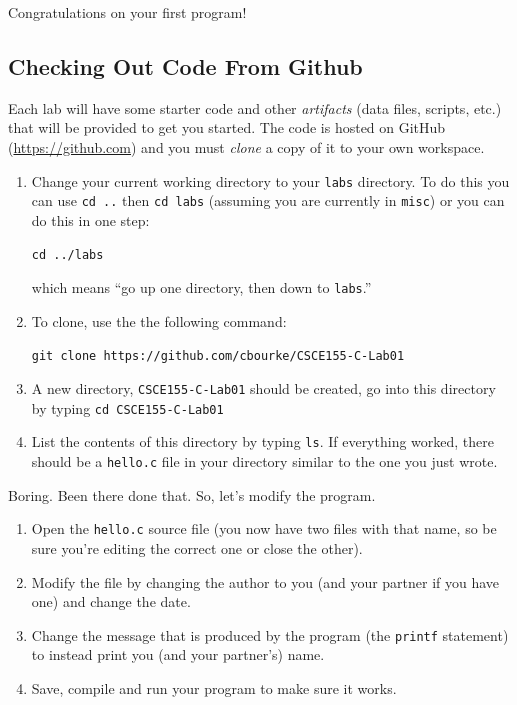 \documentclass[12pt]{scrartcl}
\begin{document}
Congratulations on your first program!

\subsection{Checking Out Code From Github}

Each lab will have some starter code and other \emph{artifacts} (data files, 
scripts, etc.) that will be provided to get you started.  The code is hosted
on GitHub (\url{https://github.com}) and you must \emph{clone} a copy of
it to your own workspace.

\begin{enumerate}
  \item Change your current working directory to your \texttt{labs}
  directory.  To do this you can use \texttt{cd ..} then 
  \texttt{cd labs} (assuming you are currently in \texttt{misc})
  or you can do this in one step: 
  
  \texttt{cd ../labs}
  
  which means ``go up one directory, then down to \texttt{labs}.''
  \item To clone, use the the following command:
  
  \texttt{git clone https://github.com/cbourke/CSCE155-C-Lab01}

  \item A new directory, \texttt{CSCE155-C-Lab01} should be created, 
  go into this directory by typing \texttt{cd CSCE155-C-Lab01}
  
  \item List the contents of this directory by typing \texttt{ls}.  
  If everything worked, there should be a \texttt{hello.c} 
  file in your directory similar to the one you just wrote.
\end{enumerate}

Boring.  Been there done that.  So, let's modify the program. 

\begin{enumerate}
  \item Open the \texttt{hello.c} source file (you now
  have two files with that name, so be sure you're editing the
  correct one or close the other).
  \item Modify the file by changing the author to you (and your 
  partner if you have one) and change the date.
  \item Change the message that is produced by the program (the
    \texttt{printf} statement) to instead
  	print you (and your partner's) name.
  \item Save, compile and run your program to make sure it works.
\end{enumerate}
\end{document}
